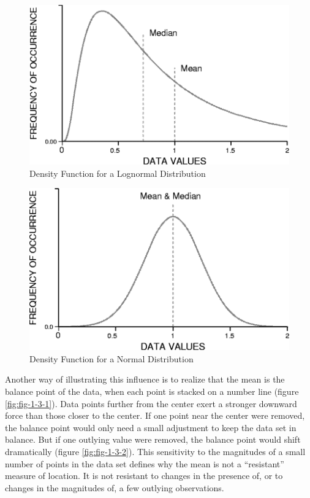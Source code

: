 \documentclass[]{book}
\begin{document}
\begin{figure}

{\centering \includegraphics[width=6.14in]{figures/1_1} 

}

\caption{Density Function for a Lognormal Distribution}\label{fig:fig-1-1}
\end{figure}
\begin{figure}

{\centering \includegraphics[width=6.04in]{figures/1_2} 

}

\caption{Density Function for a Normal Distribution}\label{fig:fig-1-2}
\end{figure}

Another way of illustrating this influence is to realize that the mean is the balance point of the data, when each point is stacked on a number line (figure \ref{fig:fig-1-3-1}). Data points further from the center exert a stronger downward force than those closer to the center. If one point near the center were removed, the balance point would only need a small adjustment to keep the data set in balance. But if one outlying value were removed, the balance point would shift dramatically (figure \ref{fig:fig-1-3-2}). This sensitivity to the magnitudes of a small number of points in the data set defines why the mean is not a ``resistant'' measure of location. It is not resistant to changes in the presence of, or to changes in the magnitudes of, a few outlying observations.
\end{document}
